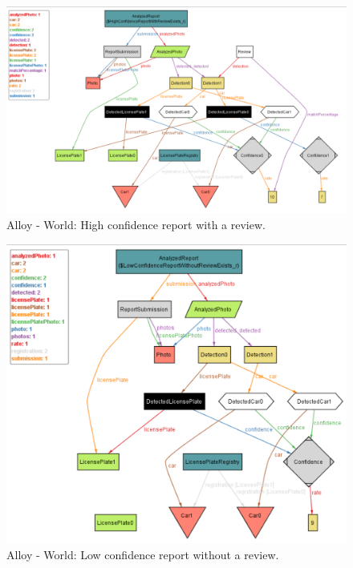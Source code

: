 \begin{figure}[H]
    \centering
    \includegraphics[width=\textwidth]{Images/alloy/7.png}
    \caption{\label{fig:alloy}Alloy - World: High confidence report with a review.}
\end{figure}

\begin{figure}[H]
    \centering
    \includegraphics[width=\textwidth]{Images/alloy/8.png}
    \caption{\label{fig:alloy}Alloy - World: Low confidence report without a review.}
\end{figure}

